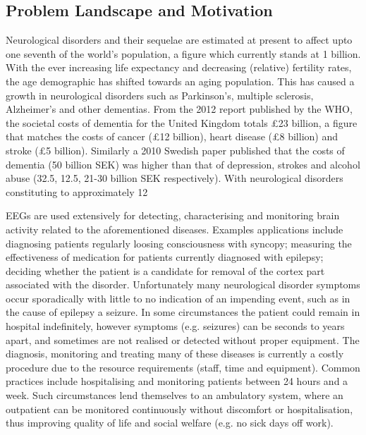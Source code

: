 \documentclass[]{article}
\begin{document}
\subsection{Problem Landscape and Motivation}
Neurological disorders and their sequelae are estimated at present to affect upto one seventh of the world's population, a figure which currently stands at 1 billion. With the ever increasing life expectancy and decreasing (relative) fertility rates, the age demographic has shifted towards an aging population. This has caused a growth in neurological disorders such as Parkinson's, multiple sclerosis, Alzheimer's and other dementias. From the 2012 report published by the \ac{WHO}\cite{WorldHealthOrganization2012}, the societal costs of dementia for the United Kingdom totals £23 billion, a figure that matches the costs of cancer (£12 billion), heart disease (£8 billion) and stroke (£5 billion). Similarly a 2010 Swedish paper published that the costs of dementia (50 billion SEK) was higher than that of depression, strokes and alcohol abuse (32.5, 12.5, 21-30 billion SEK respectively)\cite{Wimo2010}. With neurological disorders constituting to approximately 12%

\ac{EEG}s are used extensively for detecting, characterising and monitoring brain activity related to the aforementioned diseases. Examples applications include diagnosing patients regularly loosing consciousness with syncopy; measuring the effectiveness of medication for patients currently diagnosed with epilepsy\cite{Duncan2006}; deciding whether the patient is a candidate for removal of the cortex part associated with the disorder\cite{Zijlmans2007}. Unfortunately many neurological disorder symptoms occur sporadically with little to no indication of an impending event, such as in the cause of epilepsy a seizure. In some circumstances the patient could remain in hospital indefinitely, however symptoms (e.g. seizures) can be seconds to years apart, and sometimes are not realised or detected without proper equipment. The diagnosis, monitoring and treating many of these diseases is currently a costly procedure due to the resource requirements (staff, time and equipment). Common practices include hospitalising and monitoring patients between 24 hours and a week.  Such circumstances lend themselves to an ambulatory system, where an outpatient can be monitored continuously without discomfort or hospitalisation, thus improving quality of life and social welfare (e.g. no sick days off work).
\end{document}
